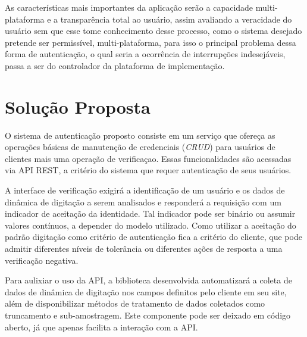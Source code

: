 \documentclass[pfc]{imetex}
\begin{document}
As características mais importantes da aplicação serão a capacidade multi-plataforma e a transparência  total ao usuário\cite{Transparency}, assim avaliando a veracidade do usuário sem que esse tome conhecimento desse processo, como o sistema desejado pretende ser permissível, multi-plataforma, para isso o principal problema dessa forma de autenticação, o qual seria a ocorrência de interrupções indesejáveis, passa a ser do controlador da plataforma de implementação.

\label{relacionados}

\chapter{Solução Proposta}
\label{solucao}
O sistema de autenticação proposto consiste em um serviço que ofereça as operações básicas de manutenção de credenciais (\textit{CRUD}) para usuários de clientes mais uma operação de verificaçao. Essas funcionalidades são acessadas via API REST, a critério do sistema que requer autenticação de seus usuários.

A interface de verificação exigirá a identificação de um usuário e os dados de dinâmica de digitação a serem analisados e responderá a requisição com um indicador de aceitação da identidade. Tal indicador pode ser binário ou assumir valores contínuos, a depender do modelo utilizado. Como utilizar a aceitação do padrão digitação como critério de autenticação fica a critério do cliente, que pode admitir diferentes níveis de tolerância ou diferentes ações de resposta a uma verificação negativa.

Para aulixiar o uso da API, a biblioteca desenvolvida automatizará a coleta de dados de dinâmica de digitação nos campos definitos pelo cliente em seu site, além de disponibilizar métodos de tratamento de dados coletados como truncamento e sub-amostragem. Este componente pode ser deixado em código aberto, já que apenas facilita a interação com a API.

\begin{center}
    \noindent{}
\end{center}
\end{document}
